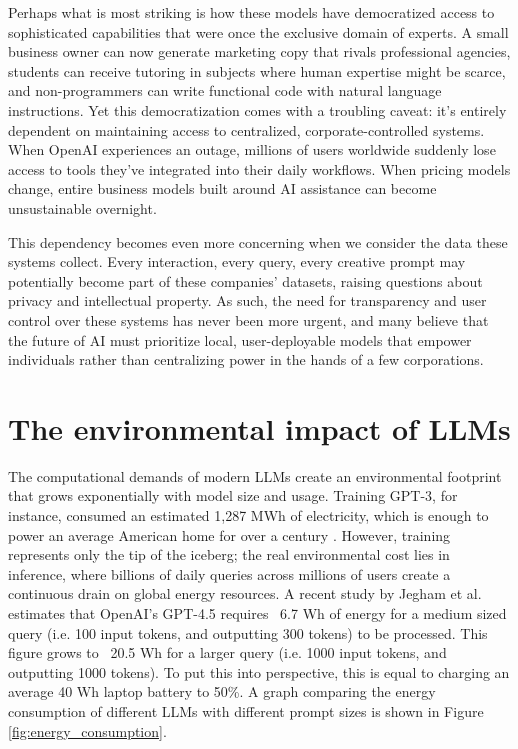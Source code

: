 Perhaps what is most striking is how these models have democratized access to sophisticated capabilities that were once the exclusive domain of experts. A small business owner can now generate marketing copy that rivals professional agencies, students can receive tutoring in subjects where human expertise might be scarce, and non-programmers can write functional code with natural language instructions. Yet this democratization comes with a troubling caveat: it's entirely dependent on maintaining access to centralized, corporate-controlled systems. When OpenAI experiences an outage, millions of users worldwide suddenly lose access to tools they've integrated into their daily workflows. When pricing models change, entire business models built around AI assistance can become unsustainable overnight.

This dependency becomes even more concerning when we consider the data these systems collect. Every interaction, every query, every creative prompt may potentially become part of these companies' datasets, raising questions about privacy and intellectual property.
As such, the need for transparency and user control over these systems has never been more urgent, and many believe that the future of AI must prioritize local, user-deployable models that empower individuals rather than centralizing power in the hands of a few corporations.

\section{The environmental impact of LLMs}

The computational demands of modern LLMs create an environmental footprint that grows exponentially with model size and usage. Training GPT-3, for instance, consumed an estimated 1,287 MWh of electricity, which is enough to power an average American home for over a century \cite{gpt_energy}. However, training represents only the tip of the iceberg; the real environmental cost lies in inference, where billions of daily queries across millions of users create a continuous drain on global energy resources. A recent study by Jegham et al. \cite{hungry_ai} estimates that OpenAI's GPT-4.5 requires ~6.7 Wh of energy for a medium sized query (i.e. 100 input tokens, and outputting 300 tokens) to be processed. This figure grows to ~20.5 Wh for a larger query (i.e. 1000 input tokens, and outputting 1000 tokens). To put this into perspective, this is equal to charging an average 40 Wh laptop battery to 50\%. A graph comparing the energy consumption of different LLMs with different prompt sizes is shown in Figure \ref{fig:energy_consumption}.

